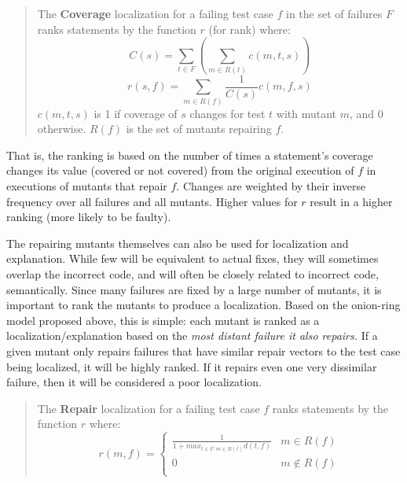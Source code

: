 \begin{quote}
The {\bf Coverage} localization for a failing test case $f$ in the set
of failures $F$ ranks
statements by the function $r$ (for rank) where:
$$C(s) = \sum_{t \in F} (\sum_{m \in R(t)} c(m,t,s))$$
$$r(s,f) = \sum_{m \in R(f)}\frac{1}{C(s)}c(m,f,s)$$
$c(m,t,s)$ is 1 if coverage of $s$ changes for test $t$
with mutant $m$, and 0 otherwise.  $R(f)$ is the set of mutants repairing $f$.
\end{quote}

That is, the ranking is based on the number of times a statement's
coverage changes its value (covered or not covered) from the original
execution of $f$ in executions of mutants that repair $f$.  Changes are weighted by their inverse frequency over all
failures and all mutants.
Higher values for $r$ result in a higher ranking (more likely to
be faulty).  

The repairing mutants themselves can also be used for localization and
explanation.  While few will be equivalent to actual fixes, they
will sometimes overlap the incorrect code, and will often be closely
related to incorrect code, semantically.  Since many failures are
fixed by a large number of mutants, it is important to rank the
mutants to produce a localization.  Based on the onion-ring model proposed above, this is simple: each mutant is ranked as
a localization/explanation based on the \emph{most distant failure it also
  repairs.}  If a given mutant only repairs failures that have similar
repair vectors to the test case being localized, it will be highly
ranked.  If it repairs even one very dissimilar failure, then it will
be considered a poor localization.

\begin{quote}
The {\bf Repair} localization for a failing test case $f$ ranks
statements by the function $r$ where:
\[
r(m,f) = 
\begin{cases}
\frac{1}{1 + max_{t \in F: m \in R(t)} d(t,f)} & m \in R(f)\\
0 & m \not\in R(f)\\
\end{cases}
\]
\end{quote}

